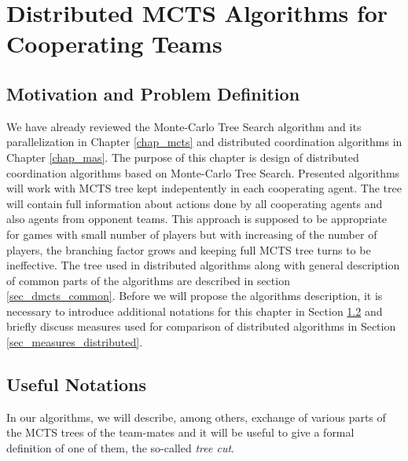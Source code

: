 \chapter{Distributed MCTS Algorithms for Cooperating Teams}
\label{chap_dmcts_design}



\section{Motivation and Problem Definition}


We have already reviewed the Monte-Carlo Tree Search algorithm and its parallelization in
 Chapter \ref{chap_mcts} and distributed coordination algorithms in Chapter \ref{chap_mas}.
 The purpose of this chapter is design of distributed coordination algorithms based on
 Monte-Carlo Tree Search. Presented algorithms will work with MCTS tree kept indepentently in
 each cooperating agent. The tree will contain full information about actions done by all
 cooperating agents and also agents from opponent teams. This approach is supposed to be
 appropriate for games with small number of players but with increasing of the number of
 players, the branching factor grows and keeping full MCTS tree turns to be ineffective. The
 tree used in distributed algorithms along with general description of common parts of the
 algorithms are described in section \ref{sec_dmcts_common}. Before we will propose the
 algorithms description, it is necessary to introduce additional notations for this chapter in
 Section \ref{sec_notations_dmcts} and briefly discuss measures used for comparison of
 distributed algorithms in Section \ref{sec_measures_distributed}. 



\section{Useful Notations}
\label{sec_notations_dmcts}

In our algorithms, we will describe, among others, exchange of various parts of the MCTS trees of
the team-mates and it will be useful to give a formal definition of one of them, the so-called
\emph{tree cut}.

